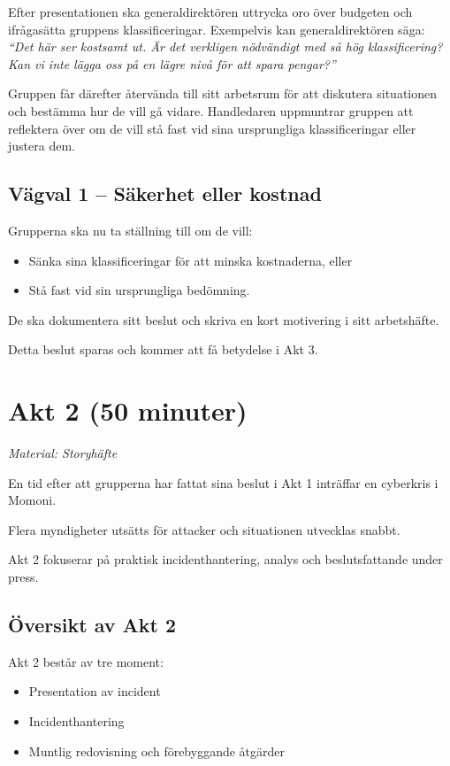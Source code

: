 \documentclass{article}
\begin{document}
Efter presentationen ska generaldirektören uttrycka oro över budgeten och ifrågasätta gruppens klassificeringar. Exempelvis kan generaldirektören säga:  
\textit{“Det här ser kostsamt ut. Är det verkligen nödvändigt med så hög klassificering? Kan vi inte lägga oss på en lägre nivå för att spara pengar?”}  

Gruppen får därefter återvända till sitt arbetsrum för att diskutera situationen och bestämma hur de vill gå vidare. Handledaren uppmuntrar gruppen att reflektera över om de vill stå fast vid sina ursprungliga klassificeringar eller justera dem.

\subsection{Vägval 1 – Säkerhet eller kostnad}

Grupperna ska nu ta ställning till om de vill:
\begin{itemize}
    \item Sänka sina klassificeringar för att minska kostnaderna, eller
    \item Stå fast vid sin ursprungliga bedömning.
\end{itemize}

De ska dokumentera sitt beslut och skriva en kort motivering i sitt arbetshäfte.

Detta beslut sparas och kommer att få betydelse i Akt 3.

\section{Akt 2 (50 minuter)}
\textit{Material: Storyhäfte}

En tid efter att grupperna har fattat sina beslut i Akt 1 inträffar en cyberkris i Momoni.

Flera myndigheter utsätts för attacker och situationen utvecklas snabbt.

Akt 2 fokuserar på praktisk incidenthantering, analys och beslutsfattande under press.

\subsection{Översikt av Akt 2}

Akt 2 består av tre moment:
\begin{itemize}
    \item Presentation av incident
    \item Incidenthantering
    \item Muntlig redovisning och förebyggande åtgärder
\end{itemize}
\end{document}
